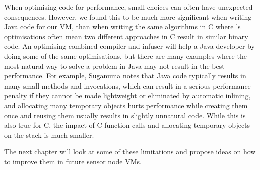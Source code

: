 When optimising code for performance, small choices can often have unexpected consequences. However, we found this to be much more significant when writing Java code for our VM, than when writing the same algorithms in C where 's optimisations often mean two different approaches in C result in similar binary code. An optimising combined compiler and infuser will help a Java developer by doing some of the same optimisations, but there are many examples where the most natural way to solve a problem in Java may not result in the best performance. For example, Suganuma \cite{Suganuma:2000vl} notes that Java code typically results in many small methods and invocations, which can result in a serious performance penalty if they cannot be made lightweight or eliminated by automatic inlining, and allocating many temporary objects hurts performance while creating them once and reusing them usually results in slightly unnatural code. While this is also true for C, the impact of C function calls and allocating temporary objects on the stack is much smaller.

The next chapter will look at some of these limitations and propose ideas on how to improve them in future sensor node VMs.

